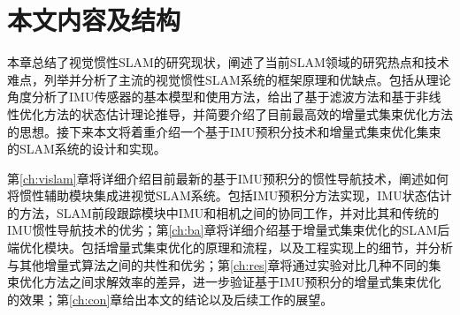 




\section{本文内容及结构}

本章总结了视觉惯性SLAM的研究现状，阐述了当前SLAM领域的研究热点和技术难点，列举并分析了主流的视觉惯性SLAM系统的框架原理和优缺点。包括从理论角度分析了IMU传感器的基本模型和使用方法，给出了基于滤波方法和基于非线性优化方法的状态估计理论推导，并简要介绍了目前最高效的增量式集束优化方法的思想。接下来本文将着重介绍一个基于IMU预积分技术和增量式集束优化集束的SLAM系统的设计和实现。

第\ref{ch:vislam}章将详细介绍目前最新的基于IMU预积分的惯性导航技术，阐述如何将惯性辅助模块集成进视觉SLAM系统。包括IMU预积分方法实现，IMU状态估计的方法，SLAM前段跟踪模块中IMU和相机之间的协同工作，并对比其和传统的IMU惯性导航技术的优劣；第\ref{ch:ba}章将详细介绍基于增量式集束优化的SLAM后端优化模块。包括增量式集束优化的原理和流程，以及工程实现上的细节，并分析与其他增量式算法之间的共性和优劣；第\ref{ch:res}章将通过实验对比几种不同的集束优化方法之间求解效率的差异，进一步验证基于IMU预积分的增量式集束优化的效果；第\ref{ch:con}章给出本文的结论以及后续工作的展望。
